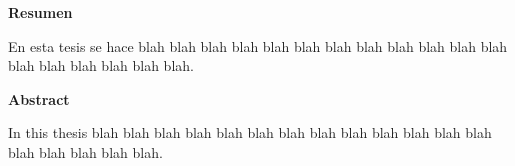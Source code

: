 \documentclass[12pt]{book}
\theoremstyle{definition}
\newcounter{in}
\begin{document}
\thispagestyle{empty}
\begin{flushleft}
  {\bfseries\Large Resumen}
\end{flushleft}

En esta tesis se hace blah blah blah blah blah blah blah blah blah
blah blah blah blah blah blah blah blah blah.

\vspace{2cm}

\begin{flushleft}
  {\bfseries\Large Abstract}
\end{flushleft}

In this thesis blah blah blah blah blah blah blah blah blah
blah blah blah blah blah blah blah blah blah.



 \newpage \thispagestyle{empty}
\end{document}
